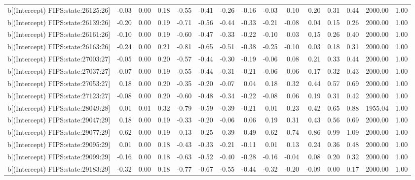 \begin{table}[ht]
\begin{tabular}{rrrrrrrrrrrrrrr}
  b[(Intercept) FIPS:state:26125:26] & -0.03 & 0.00 & 0.18 & -0.55 & -0.41 & -0.26 & -0.16 & -0.03 & 0.10 & 0.20 & 0.31 & 0.44 & 2000.00 & 1.00 \\ 
  b[(Intercept) FIPS:state:26139:26] & -0.20 & 0.00 & 0.19 & -0.71 & -0.56 & -0.44 & -0.33 & -0.21 & -0.08 & 0.04 & 0.15 & 0.26 & 2000.00 & 1.00 \\ 
  b[(Intercept) FIPS:state:26161:26] & -0.10 & 0.00 & 0.19 & -0.60 & -0.47 & -0.33 & -0.22 & -0.10 & 0.03 & 0.15 & 0.26 & 0.40 & 2000.00 & 1.00 \\ 
  b[(Intercept) FIPS:state:26163:26] & -0.24 & 0.00 & 0.21 & -0.81 & -0.65 & -0.51 & -0.38 & -0.25 & -0.10 & 0.03 & 0.18 & 0.31 & 2000.00 & 1.00 \\ 
  b[(Intercept) FIPS:state:27003:27] & -0.05 & 0.00 & 0.20 & -0.57 & -0.44 & -0.30 & -0.19 & -0.06 & 0.08 & 0.21 & 0.33 & 0.44 & 2000.00 & 1.00 \\ 
  b[(Intercept) FIPS:state:27037:27] & -0.07 & 0.00 & 0.19 & -0.55 & -0.44 & -0.31 & -0.21 & -0.06 & 0.06 & 0.17 & 0.32 & 0.43 & 2000.00 & 1.00 \\ 
  b[(Intercept) FIPS:state:27053:27] & 0.18 & 0.00 & 0.20 & -0.35 & -0.20 & -0.07 & 0.04 & 0.18 & 0.32 & 0.44 & 0.57 & 0.69 & 2000.00 & 1.00 \\ 
  b[(Intercept) FIPS:state:27123:27] & -0.08 & 0.00 & 0.20 & -0.60 & -0.48 & -0.34 & -0.22 & -0.08 & 0.06 & 0.19 & 0.31 & 0.42 & 2000.00 & 1.00 \\ 
  b[(Intercept) FIPS:state:28049:28] & 0.01 & 0.01 & 0.32 & -0.79 & -0.59 & -0.39 & -0.21 & 0.01 & 0.23 & 0.42 & 0.65 & 0.88 & 1955.04 & 1.00 \\ 
  b[(Intercept) FIPS:state:29047:29] & 0.18 & 0.00 & 0.19 & -0.33 & -0.20 & -0.06 & 0.06 & 0.19 & 0.31 & 0.43 & 0.56 & 0.69 & 2000.00 & 1.00 \\ 
  b[(Intercept) FIPS:state:29077:29] & 0.62 & 0.00 & 0.19 & 0.13 & 0.25 & 0.39 & 0.49 & 0.62 & 0.74 & 0.86 & 0.99 & 1.09 & 2000.00 & 1.00 \\ 
  b[(Intercept) FIPS:state:29095:29] & 0.01 & 0.00 & 0.18 & -0.43 & -0.33 & -0.21 & -0.11 & 0.01 & 0.13 & 0.24 & 0.36 & 0.48 & 2000.00 & 1.00 \\ 
  b[(Intercept) FIPS:state:29099:29] & -0.16 & 0.00 & 0.18 & -0.63 & -0.52 & -0.40 & -0.28 & -0.16 & -0.04 & 0.08 & 0.20 & 0.32 & 2000.00 & 1.00 \\ 
  b[(Intercept) FIPS:state:29183:29] & -0.32 & 0.00 & 0.18 & -0.77 & -0.67 & -0.55 & -0.44 & -0.32 & -0.20 & -0.09 & 0.00 & 0.17 & 2000.00 & 1.00 \\ 

\end{tabular}
\end{table}
